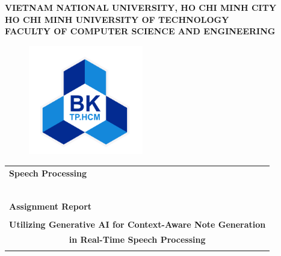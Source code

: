 \documentclass[12pt,a4paper]{article}
\begin{document}
\begin{titlepage}

    \begin{center}
        \large \textbf{VIETNAM NATIONAL UNIVERSITY, HO CHI MINH CITY} \\
        \large \textbf{HO CHI MINH UNIVERSITY OF TECHNOLOGY} \\
        \large \textbf{FACULTY OF COMPUTER SCIENCE AND ENGINEERING}
    \end{center}

    \begin{figure}[h!]
        \begin{center}
            \includegraphics[width=5cm]{Images/hcmut.png}
        \end{center}
    \end{figure}

    \begin{center}
        \begin{tabular}{c}
        \multicolumn{1}{l}{\textbf{{\Large Speech Processing}}}\\
        ~~\\
        \hline
        \\
        \multicolumn{1}{l}{\textbf{{\Large Assignment Report}}}\\
        \\
        \textbf{{\Large Utilizing Generative AI for Context-Aware Note
        Generation}}\\
        \textbf{{\Large in Real-Time Speech Processing}}\\
        \\
        \hline
        \end{tabular}
        \end{center}


\end{titlepage}
\end{document}
